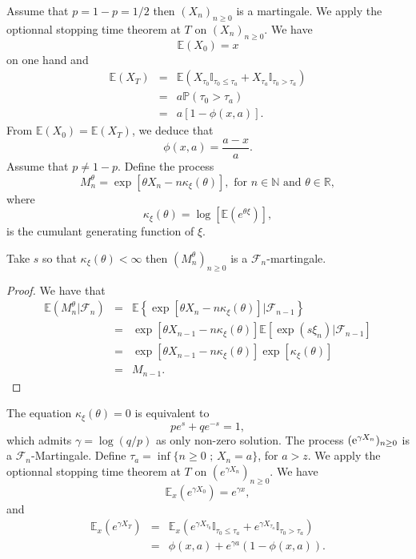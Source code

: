 Assume that $p=1- p =1/2$ then $(X_n)_{n\geq 0}$ is a martingale. We apply the optionnal stopping time theorem at $T$ on $(X_n)_{n\geq 0}$. We have 
$$
\mathbb{E}(X_0) = x
$$
on one hand and 
\begin{eqnarray*}
\mathbb{E}(X_T)&=&\mathbb{E}(X_{\tau_0}\mathbb{I}_{\tau_0\leq \tau_a} + X_{\tau_a}\mathbb{I}_{\tau_0> \tau_a})\\
&=&a\mathbb{P}(\tau_0>\tau_a)\\
&=&a\left[1-\phi(x,a)\right].
\end{eqnarray*}
From $\mathbb{E}(X_0) =\mathbb{E}(X_T)$, we deduce that 
$$
\phi(x,a) = \frac{a-x}{a}.
$$
Assume that $p\neq 1-p $. Define the process 
$$
M_n^\theta = \exp\left[\theta X_n- n\kappa_\xi(\theta)\right],\text{ for }n\in\mathbb{N}\text{ and }\theta\in\mathbb{R}, 
$$
where
$$
\kappa_\xi(\theta) = \log\left[\mathbb{E}\left(e^{\theta\xi}\right)\right],
$$
is the cumulant generating function of $\xi$. 
\begin{lemma}\label{lem:wald_martingale_RW}
Take $s$ so that $\kappa_\xi(\theta)<\infty$ then $(M_n^\theta)_{n\geq0}$ is a $\mathcal{F}_n$-martingale.
\end{lemma}
\begin{proof}
We have that 
\begin{eqnarray*}
\mathbb{E}(M_n^\theta|\mathcal{F}_n)&=&\mathbb{E}\left\{\exp\left[\theta X_n - n\kappa_\xi(\theta)\right]|\mathcal{F}_{n-1}\right\}\\
&=&\exp\left[\theta X_{n-1} - n\kappa_\xi(\theta)\right]\mathbb{E}\left[\exp\left(s\xi_{n}\right)|\mathcal{F}_{n-1}\right]\\
&=&\exp\left[\theta X_{n-1}- n\kappa_\xi(\theta) \right]\exp[ \kappa_\xi(\theta) ]\\
&=& M_{n-1}.
\end{eqnarray*}
\end{proof} 
The equation $\kappa_\xi(\theta) = 0$ is equivalent to 
$$
pe^s+qe^{-s} = 1,
$$
which admits $\gamma =\log(q/p)$ as only non-zero solution. The process $(\mathrm{e}^{\gamma X_n})_{n\geq0}$ is a $\mathcal{F}_n$-Martingale. Define $\tau_a = \inf\{n\geq 0\text{ ; }X_n = a\}$, for $a>z$. We apply the optionnal stopping time theorem at $T$ on $\left(e^{\gamma X_n}\right)_{n\geq 0}$. We have
$$
\mathbb{E}_x(e^{\gamma X_0}) = e^{\gamma x},
$$
and 
\begin{eqnarray*}
 \mathbb{E}_x(e^{\gamma X_{T}}) &=& \mathbb{E}_x(e^{\gamma X_{\tau_0}}\mathbb{I}_{\tau_0\leq \tau_a} + e^{\gamma X_{\tau_a}}\mathbb{I}_{\tau_0> \tau_a})\\
 &=& \phi(x,a) + e^{\gamma a}(1-\phi(x,a)).
\end{eqnarray*}
